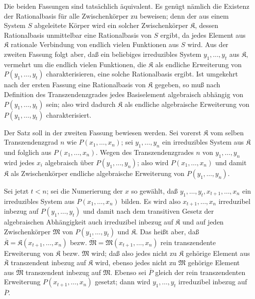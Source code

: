 Die beiden Fassungen sind tatsächlich äquivalent. Es genügt nämlich die Existenz der Rationalbasis für alle Zwischenkörper zu beweisen; denn der aus einem System $S$ abgeleitete Körper wird ein solcher Zwischenkörper $\mathfrak K$, dessen Rationalbasis unmittelbar eine Rationalbasis von $S$ ergibt, da jedes Element aus $\mathfrak K$ rationale Verbindung von endlich vielen Funktionen aus $S$ wird. Aus der zweiten Fassung folgt aber, daß ein beliebiges irreduzibles System $y_1,\ldots,y_t$ aus $\mathfrak K$, vermehrt um die endlich vielen Funktionen, die $\mathfrak K$ als endliche Erweiterung von $P(y_1,\ldots,y_t)$ charakterisieren, eine solche Rationalbasis ergibt. Ist umgekehrt nach der ersten Fassung eine Rationalbasis von $\mathfrak K$ gegeben, so muß nach Definition des Transzendenzgrades jedes Basiselement algebraisch abhängig von $P(y_1,\ldots,y_t)$ sein; also wird dadurch $\mathfrak K$ als endliche algebraische Erweiterung von $P(y_1,\ldots,y_t)$ charakterisiert.

Der Satz soll in der zweiten Fassung bewiesen werden. Sei vorerst $\mathfrak K$ vom selben Transzendenzgrad $n$ wie $P(x_1,\ldots,x_n)$; sei $y_1,\ldots,y_n$ ein irreduzibles System aus $\mathfrak K$ und folglich aus $P(x_1,\ldots,x_n)$. Wegen des Transzendenzgrades $n$ von $y_1,\ldots,y_n$ wird jedes $x_i$ algebraisch über $P(y_1,\ldots,y_n)$; also wird $P(x_1,\ldots,x_n)$ und damit $\mathfrak K$ als Zwischenkörper endliche algebraische Erweiterung von $P(y_1,\ldots,y_n)$.

Sei jetzt $t<n$; sei die Numerierung der $x$ so gewählt, daß $y_1,\ldots,y_t,x_{t+1},\ldots,x_n$ ein irreduzibles System aus $P(x_1,\ldots,x_n)$ bilden. Es wird also $x_{t+1},\ldots,x_n$ irreduzibel inbezug auf $P(y_1,\ldots,y_t)$ und damit nach dem transitiven Gesetz der algebraischen Abhängigkeit auch irreduzibel inbezug auf $\mathfrak K$ und auf jeden Zwischenkörper $\mathfrak M$ von $P(y_1,\ldots,y_t)$ und $\mathfrak K$. Das heißt aber, daß $\overline{\mathfrak K}=\mathfrak K(x_{t+1},\ldots,x_n)$ bezw. $\overline{\mathfrak M}=\mathfrak M(x_{t+1},\ldots,x_n)$ rein transzendente Erweiterung von $\mathfrak K$ bezw. $\mathfrak M$ wird; daß also jedes nicht zu $\mathfrak K$ gehörige Element aus $\overline{\mathfrak K}$ transzendent inbezug auf $\mathfrak K$ wird, ebenso jedes nicht zu $\mathfrak M$ gehörige Element aus $\overline{\mathfrak M}$ transzendent inbezug auf $\mathfrak M$. Ebenso sei $\overline P$ gleich der rein transzendenten Erweiterung $P(x_{t+1},\ldots,x_n)$ gesetzt; dann wird $y_1,\ldots,y_t$ irreduzibel inbezug auf $\overline P$.

